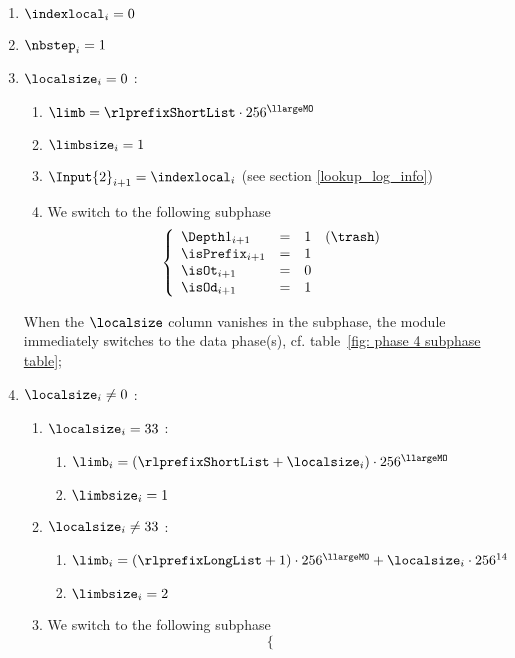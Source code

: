 \begin{description}
\begin{enumerate}[resume]
\begin{enumerate}
					\item $\indexlocal_{i} = 0$
					\item $\nbstep_{i}=1$
					\item \If $\localsize_{i}=0$ \Then:
						\begin{enumerate}
							\item $\limb = \rlprefixShortList \cdot 256^{\llargeMO}$
							\item $\limbsize_{i}=1$
							\item $\Input{2}_{i+1}=\indexlocal_{i}$ (see section \ref{lookup_log_info})
							\item We switch to the following subphase
								\[
									\left\{ \begin{array}{lclr}
										\Depth 1_{i + 1}   & = & 1 &  (\trash) \\
										\isPrefix_{i + 1}  & = & 1 &           \\
										\isOt_{i + 1}      & = & 0 &           \\
										\isOd_{i + 1}      & = & 1 &           \\
									\end{array} \right.
								\]
						\end{enumerate}
						\saNote{} When the $\localsize$ column vanishes in the subphase, the module immediately switches to the data phase(s), cf. table~\ref{fig: phase 4 subphase table}; 
					\item \If $\localsize_{i} \neq 0$ \Then:
						\begin{enumerate}
							\item \If $\localsize_{i} = 33$ \Then:
								\begin{enumerate}
									\item $\limb_{i}= (\rlprefixShortList + \localsize_{i}) \cdot 256^{\llargeMO}$
									\item $\limbsize_{i} = 1$
								\end{enumerate}
							\item \If $\localsize_{i} \neq 33$ \Then:
								\begin{enumerate}
									\item $\limb_{i}= (\rlprefixLongList + 1) \cdot 256^{\llargeMO} + \localsize_{i} \cdot 256^{14}$
									\item $\limbsize_{i} = 2$
								\end{enumerate}
							\item We switch to the following subphase
								\[
									\left\{ \begin{array}{lclr}

\end{array}\]
\end{enumerate}
\end{enumerate}
\end{enumerate}
\end{description}
